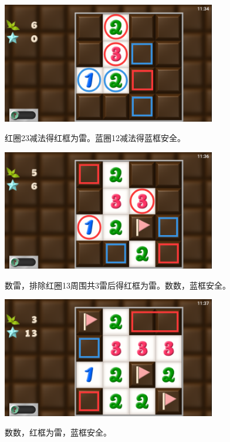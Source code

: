 \subsection{} %
\begin{center}
    \includegraphics[width=0.7\textwidth]{puzzle/166-1.png}
\end{center}
红圈23减法得红框为雷。蓝圈12减法得蓝框安全。
\begin{center}
    \includegraphics[width=0.7\textwidth]{puzzle/166-2.png}
\end{center}
数雷，排除红圈13周围共3雷后得红框为雷。数数，蓝框安全。
\begin{center}
    \includegraphics[width=0.7\textwidth]{puzzle/166-3.png}
\end{center}
数数，红框为雷，蓝框安全。

